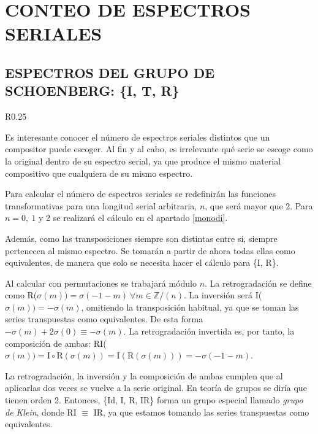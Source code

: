 	\chapter{CONTEO DE ESPECTROS SERIALES}
	\section{ESPECTROS DEL GRUPO DE SCHOENBERG: \{I, T, R\}}
		\label{espec}		
		
		\begin{wrapfigure}{R}{0.25\textwidth}
			\captionsetup{justification=centering, font=footnotesize}
			\vspace{-0.5cm}
			
		\end{wrapfigure}
		Es interesante conocer el número de espectros seriales distintos que un compositor puede escoger. Al fin y al cabo, es irrelevante qué serie se escoge como la original dentro de su espectro serial, ya que produce el mismo material compositivo que cualquiera de su mismo espectro.
		
		Para calcular el número de espectros seriales se redefinirán las funciones transformativas para una longitud serial arbitraria, $n$, que será mayor que 2. Para $n=0,\ 1$ y 2 se realizará el cálculo en el apartado \ref{monodi}. 
	
		Además, como las transposiciones siempre son distintas entre sí, siempre pertenecen al mismo espectro. Se tomarán a partir de ahora todas ellas como equivalentes, de manera que solo se necesita hacer el cálculo para \{I, R\}.
		
		Al calcular con permutaciones se trabajará módulo $n$. La retrogradación se define como R($\sigma(m))=\sigma(-1-m)\ \forall m\in \mathbb{Z} / (n)$. La inversión será I($\sigma(m))=-\sigma(m)$, omitiendo la transposición habitual, ya que se toman las series transpuestas como equivalentes. De esta forma $-\sigma(m)+2\sigma(0)\equiv-\sigma(m)$. La retrogradación invertida es, por tanto, la composición de ambas: RI($\sigma(m))=\text{I}\circ\text{R}(\sigma(m))=\text{I}\left(\text{R}(\sigma(m))\right)=-\sigma(-1-m)$.
		
		La retrogradación, la inversión y la composición de ambas cumplen que al aplicarlas dos veces se vuelve a la serie original. En teoría de grupos se diría que tienen orden 2. Entonces, \{Id, I, R, IR\} forma un grupo especial llamado \textit{grupo de Klein}, donde RI $\equiv$ IR, ya que estamos tomando las series transpuestas como equivalentes. 
		
